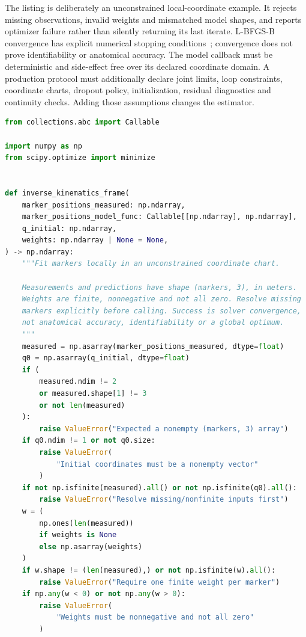 The listing is deliberately an unconstrained local-coordinate example.
It rejects missing observations, invalid weights and mismatched model shapes,
and reports optimizer failure rather than silently returning its last iterate.
L-BFGS-B convergence has explicit numerical stopping conditions~\cite{SciPyLBFGSBiological};
convergence does not prove identifiability or anatomical accuracy.
The model callback must be deterministic and side-effect free over its declared
coordinate domain.
A production protocol must additionally declare joint limits, loop constraints,
coordinate charts, dropout policy, initialization, residual diagnostics and
continuity checks. Adding those assumptions changes the estimator.

\begin{lstlisting}[language=Python, caption={A Local Single-Frame Marker Fit With Failure Checks}]
from collections.abc import Callable

import numpy as np
from scipy.optimize import minimize


def inverse_kinematics_frame(
    marker_positions_measured: np.ndarray,
    marker_positions_model_func: Callable[[np.ndarray], np.ndarray],
    q_initial: np.ndarray,
    weights: np.ndarray | None = None,
) -> np.ndarray:
    """Fit markers locally in an unconstrained coordinate chart.

    Measurements and predictions have shape (markers, 3), in meters.
    Weights are finite, nonnegative and not all zero. Resolve missing
    markers explicitly before calling. Success is solver convergence,
    not anatomical accuracy, identifiability or a global optimum.
    """
    measured = np.asarray(marker_positions_measured, dtype=float)
    q0 = np.asarray(q_initial, dtype=float)
    if (
        measured.ndim != 2
        or measured.shape[1] != 3
        or not len(measured)
    ):
        raise ValueError("Expected a nonempty (markers, 3) array")
    if q0.ndim != 1 or not q0.size:
        raise ValueError(
            "Initial coordinates must be a nonempty vector"
        )
    if not np.isfinite(measured).all() or not np.isfinite(q0).all():
        raise ValueError("Resolve missing/nonfinite inputs first")
    w = (
        np.ones(len(measured))
        if weights is None
        else np.asarray(weights)
    )
    if w.shape != (len(measured),) or not np.isfinite(w).all():
        raise ValueError("Require one finite weight per marker")
    if np.any(w < 0) or not np.any(w > 0):
        raise ValueError(
            "Weights must be nonnegative and not all zero"
        )


\end{lstlisting}
